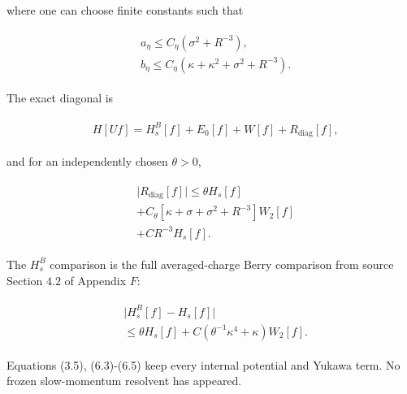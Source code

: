 where one can choose finite constants such that

\begin{gather*}
\begin{aligned}
& a_{\eta}\le C_{\eta}(\sigma ^{2}+R^{-3}), \\
& b_{\eta}\le C_{\eta}(\kappa +\kappa ^{2}+\sigma ^{2}+R^{-3}).
\end{aligned}\tag{6.2}
\end{gather*}

The exact diagonal is

\begin{gather*}
\begin{aligned}
& H[Uf]=H_{s}^{B}[f]+E_{0}[f]+W[f]+R_{\mathrm{diag}}[f],
\end{aligned}\tag{6.3}
\end{gather*}

and for an independently chosen \(\theta >0\),

\begin{gather*}
\begin{aligned}
& \vert R_{\mathrm{diag}}[f]\vert \le \theta  H_{s}[f] \\
& +C_{\theta}[\kappa +\sigma +\sigma ^{2}+R^{-3}]W_{2}[f] \\
& +C R^{-3}H_{s}[f].
\end{aligned}\tag{6.4}
\end{gather*}

The \(H_{s}^{B}\) comparison is the full averaged-charge Berry
comparison from source Section \(4.2\) of Appendix \(F\):

\begin{gather*}
\begin{aligned}
& \vert H_{s}^{B}[f]-H_{s}[f]\vert \\
& \le \theta  H_{s}[f]+C(\theta ^{-1}\kappa ^{4}+\kappa )W_{2}[f].
\end{aligned}\tag{6.5}
\end{gather*}

Equations (3.5), (6.3)-(6.5) keep every internal potential and Yukawa
term. No frozen slow-momentum resolvent has appeared.

